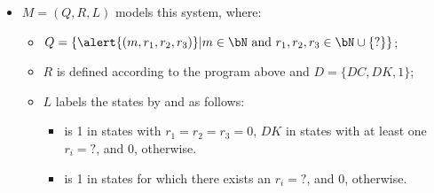 \begin{frame}
\begin{itemize}
	\item $M=(Q,R,L)$ models this system, where:
	\begin{itemize}
	\setlength\itemsep{1ex}
   \item $Q=\{\alert{(m,r_1,r_2,r_3)}|m\in\bN\mbox{ and }r_1,r_2,r_3\in\bN\cup\{?\}\}$;
   \item $R$ is defined according to the program above and $D=\{DC,DK,1\}$;
   \item $L$ labels the states by  and  as follows:
       \begin{itemize}
           \item {} is 1 in states with $r_1=r_2=r_3=0$, $DK$ in states
           with at least one $r_i=?$, and 0, otherwise.
           \item {} is 1 in states for which there exists an $r_i=?$,
           and 0, otherwise. 
       \end{itemize}
	\end{itemize}
\end{itemize}
\end{frame}

